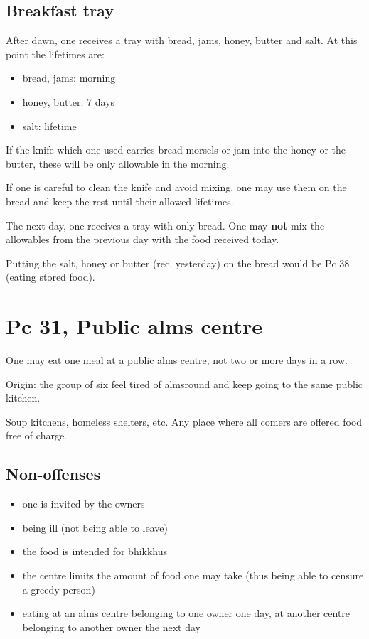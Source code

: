 \subsection{Breakfast tray}

After dawn, one receives a tray with bread, jams, honey, butter and
salt. At this point the lifetimes are:

\begin{itemize}
\tightlist
\item
  bread, jams: morning
\item
  honey, butter: 7 days
\item
  salt: lifetime
\end{itemize}

If the knife which one used carries bread morsels or jam into the honey
or the butter, these will be only allowable in the morning.

If one is careful to clean the knife and avoid mixing, one may use them
on the bread and keep the rest until their allowed lifetimes.

The next day, one receives a tray with only bread. One may \textbf{not}
mix the allowables from the previous day with the food received today.

Putting the salt, honey or butter (rec. yesterday) on the bread would be
Pc 38 (eating stored food).

\section{Pc 31, Public alms centre}

One may eat one meal at a public alms centre, not two or more days in a
row.

Origin: the group of six feel tired of almsround and keep going to the
same public kitchen.

Soup kitchens, homeless shelters, etc. Any place where all comers are
offered food free of charge.

\subsection{Non-offenses}

\begin{itemize}
\tightlist
\item
  one is invited by the owners
\item
  being ill (not being able to leave)
\item
  the food is intended for bhikkhus
\item
  the centre limits the amount of food one may take (thus being able to
  censure a greedy person)
\item
  eating at an alms centre belonging to one owner one day, at another
  centre belonging to another owner the next day
\end{itemize}

